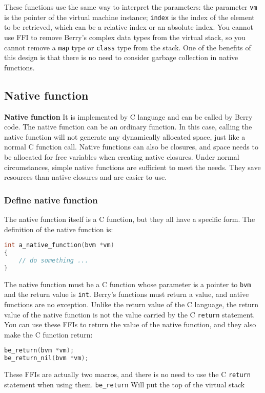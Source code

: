 These functions use the same way to interpret the parameters: the parameter \texttt{vm} is the pointer of the virtual machine instance; \texttt{index} is the index of the element to be retrieved, which can be a relative index or an absolute index. You cannot use FFI to remove Berry's complex data types from the virtual stack, so you cannot remove a \texttt{map} type or \texttt{class} type from the stack. One of the benefits of this design is that there is no need to consider garbage collection in native functions.

\subsection{Native function}

\textbf{Native function} It is implemented by C language and can be called by Berry code. The native function can be an ordinary function. In this case, calling the native function will not generate any dynamically allocated space, just like a normal C function call. Native functions can also be closures, and space needs to be allocated for free variables when creating native closures. Under normal circumstances, simple native functions are sufficient to meet the needs. They save resources than native closures and are easier to use.

\subsubsection{Define native function}

The native function itself is a C function, but they all have a specific form. The definition of the native function is:
\begin{lstlisting}[language=c, style=berry, numbers=none]
int a_native_function(bvm *vm)
{
    // do something ...
}
\end{lstlisting}
The native function must be a C function whose parameter is a pointer to \texttt{bvm} and the return value is \texttt{int}. Berry's functions must return a value, and native functions are no exception. Unlike the return value of the C language, the return value of the native function is not the value carried by the C \texttt{return} statement. You can use these FFIs to return the value of the native function, and they also make the C function return:
\begin{lstlisting}[language=c, style=berry, numbers=none]
be_return(bvm *vm);
be_return_nil(bvm *vm);
\end{lstlisting}
These FFIs are actually two macros, and there is no need to use the C \texttt{return} statement when using them. \texttt{be\_return} Will put the top of the virtual stack

